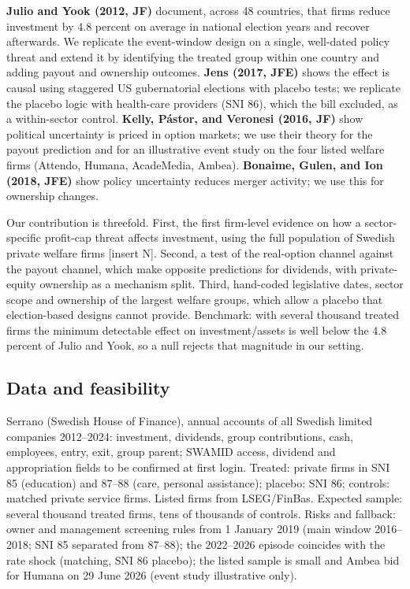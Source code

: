 \documentclass[12pt,a4paper]{article}
\begin{document}
\textbf{Julio and Yook (2012, JF)} document, across 48 countries, that firms reduce investment by 4.8 percent on average in national election years and recover afterwards. We replicate the event-window design on a single, well-dated policy threat and extend it by identifying the treated group within one country and adding payout and ownership outcomes. \textbf{Jens (2017, JFE)} shows the effect is causal using staggered US gubernatorial elections with placebo tests; we replicate the placebo logic with health-care providers (SNI 86), which the bill excluded, as a within-sector control. \textbf{Kelly, P\'astor, and Veronesi (2016, JF)} show political uncertainty is priced in option markets; we use their theory for the payout prediction and for an illustrative event study on the four listed welfare firms (Attendo, Humana, AcadeMedia, Ambea). \textbf{Bonaime, Gulen, and Ion (2018, JFE)} show policy uncertainty reduces merger activity; we use this for ownership changes.

Our contribution is threefold. First, the first firm-level evidence on how a sector-specific profit-cap threat affects investment, using the full population of Swedish private welfare firms [insert N]. Second, a test of the real-option channel against the payout channel, which make opposite predictions for dividends, with private-equity ownership as a mechanism split. Third, hand-coded legislative dates, sector scope and ownership of the largest welfare groups, which allow a placebo that election-based designs cannot provide. Benchmark: with several thousand treated firms the minimum detectable effect on investment/assets is well below the 4.8 percent of Julio and Yook, so a null rejects that magnitude in our setting.

\subsection{Data and feasibility}

Serrano (Swedish House of Finance), annual accounts of all Swedish limited companies 2012--2024: investment, dividends, group contributions, cash, employees, entry, exit, group parent; SWAMID access, dividend and appropriation fields to be confirmed at first login. Treated: private firms in SNI 85 (education) and 87--88 (care, personal assistance); placebo: SNI 86; controls: matched private service firms. Listed firms from LSEG/FinBas. Expected sample: several thousand treated firms, tens of thousands of controls. Risks and fallback: owner and management screening rules from 1 January 2019 (main window 2016--2018; SNI 85 separated from 87--88); the 2022--2026 episode coincides with the rate shock (matching, SNI 86 placebo); the listed sample is small and Ambea bid for Humana on 29 June 2026 (event study illustrative only).
\end{document}
